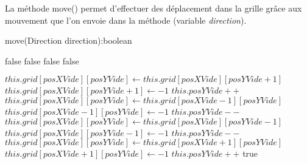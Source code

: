 \documentclass{article}
\begin{document}
\newline
La méthode move() permet d'effectuer des déplacement dans la grille grâce aux mouvement que l'on envoie dans la méthode (variable \textit{direction}).
\begin{algorithm}
    \caption{move(Direction direction):boolean}
    \begin{algorithmic}
            \RETURN false
            \RETURN false
            \RETURN false
            \RETURN false
        \ENDIF
            
            \STATE $this.grid[posXVide][posYVide] \leftarrow this.grid[posXVide][posYVide+1]$
            \STATE $this.grid[posXVide][posYVide+1] \leftarrow -1$
            \STATE $this.posYVide++$
            \STATE $this.grid[posXVide][posYVide] \leftarrow this.grid[posXVide-1][posYVide]$
            \STATE $this.grid[posXVide-1][posYVide] \leftarrow -1$
            \STATE $this.posYVide--$
            \STATE $this.grid[posXVide][posYVide] \leftarrow this.grid[posXVide][posYVide-1]$
            \STATE $this.grid[posXVide][posYVide-1] \leftarrow -1$
            \STATE $this.posYVide--$
            \STATE $this.grid[posXVide][posYVide] \leftarrow this.grid[posXVide+1][posYVide]$
            \STATE $this.grid[posXVide+1][posYVide] \leftarrow -1$
            \STATE $this.posYVide++$
        \ENDIF
        \RETURN true
    \end{algorithmic}
\end{algorithm}
\end{document}
